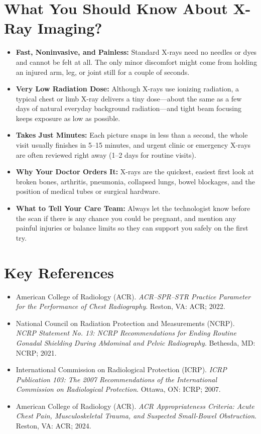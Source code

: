 \section{What You Should Know About X-Ray Imaging?}

\begin{itemize}
    \item \textbf{Fast, Noninvasive, and Painless:} Standard X-rays need no needles or dyes and cannot be felt at all. The only minor discomfort might come from holding an injured arm, leg, or joint still for a couple of seconds.
    \item \textbf{Very Low Radiation Dose:} Although X-rays use ionizing radiation, a typical chest or limb X-ray delivers a tiny dose---about the same as a few days of natural everyday background radiation---and tight beam focusing keeps exposure as low as possible.
    \item \textbf{Takes Just Minutes:} Each picture snaps in less than a second, the whole visit usually finishes in 5--15 minutes, and urgent clinic or emergency X-rays are often reviewed right away (1--2 days for routine visits).
    \item \textbf{Why Your Doctor Orders It:} X-rays are the quickest, easiest first look at broken bones, arthritis, pneumonia, collapsed lungs, bowel blockages, and the position of medical tubes or surgical hardware.
    \item \textbf{What to Tell Your Care Team:} Always let the technologist know before the scan if there is any chance you could be pregnant, and mention any painful injuries or balance limits so they can support you safely on the first try.
\end{itemize}

\section{Key References}

\begin{itemize}
    \item American College of Radiology (ACR). \textit{ACR--SPR--STR Practice Parameter for the Performance of Chest Radiography}. Reston, VA: ACR; 2022.
    \item National Council on Radiation Protection and Measurements (NCRP). \textit{NCRP Statement No. 13: NCRP Recommendations for Ending Routine Gonadal Shielding During Abdominal and Pelvic Radiography}. Bethesda, MD: NCRP; 2021.
    \item International Commission on Radiological Protection (ICRP). \textit{ICRP Publication 103: The 2007 Recommendations of the International Commission on Radiological Protection}. Ottawa, ON: ICRP; 2007.
    \item American College of Radiology (ACR). \textit{ACR Appropriateness Criteria: Acute Chest Pain, Musculoskeletal Trauma, and Suspected Small-Bowel Obstruction}. Reston, VA: ACR; 2024.
\end{itemize}
